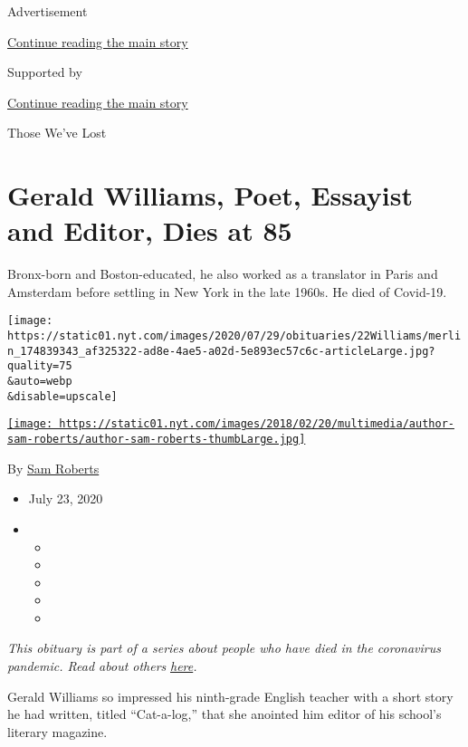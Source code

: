 Advertisement

\protect\hyperlink{after-top}{Continue reading the main story}

Supported by

\protect\hyperlink{after-sponsor}{Continue reading the main story}

Those We've Lost

\hypertarget{gerald-williams-poet-essayist-and-editor-dies-at-85}{%
\section{Gerald Williams, Poet, Essayist and Editor, Dies at
85}\label{gerald-williams-poet-essayist-and-editor-dies-at-85}}

Bronx-born and Boston-educated, he also worked as a translator in Paris
and Amsterdam before settling in New York in the late 1960s. He died of
Covid-19.

\texttt{[image: https://static01.nyt.com/images/2020/07/29/obituaries/22Williams/merlin\_174839343\_af325322-ad8e-4ae5-a02d-5e893ec57c6c-articleLarge.jpg?quality=75\\\&auto=webp\\\&disable=upscale]}

\href{https://www.nytimes.com/by/sam-roberts}{\texttt{[image: https://static01.nyt.com/images/2018/02/20/multimedia/author-sam-roberts/author-sam-roberts-thumbLarge.jpg]}}

By \href{https://www.nytimes.com/by/sam-roberts}{Sam Roberts}

\begin{itemize}
\item
  July 23, 2020
\item
  \begin{itemize}
  \item
  \item
  \item
  \item
  \item
  \end{itemize}
\end{itemize}

\emph{This obituary is part of a series about people who have died in
the coronavirus pandemic. Read about others}
\href{https://www.nytimes.com/interactive/2020/obituaries/people-died-coronavirus-obituaries.html}{\emph{here}}\emph{.}

Gerald Williams so impressed his ninth-grade English teacher with a
short story he had written, titled ``Cat-a-log,'' that she anointed him
editor of his school's literary magazine.


